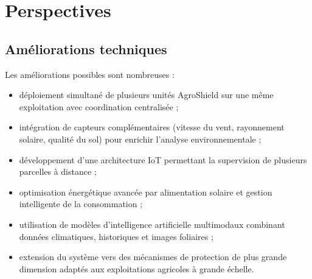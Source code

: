 ﻿\documentclass[11pt,a4paper,openany]{report}
\begin{document}
\chapter{Perspectives}
\section{Améliorations techniques}

Les améliorations possibles sont nombreuses :

\begin{itemize}

\item déploiement simultané de plusieurs unités AgroShield sur une même exploitation avec coordination centralisée ;

\item intégration de capteurs complémentaires (vitesse du vent, rayonnement solaire, qualité du sol) pour enrichir l'analyse environnementale ;

\item développement d'une architecture IoT permettant la supervision de plusieurs parcelles à distance ;

\item optimisation énergétique avancée par alimentation solaire et gestion intelligente de la consommation ;

\item utilisation de modèles d'intelligence artificielle multimodaux combinant données climatiques, historiques et images foliaires ;

\item extension du système vers des mécanismes de protection de plus grande dimension adaptés aux exploitations agricoles à grande échelle.

\end{itemize}
\end{document}

